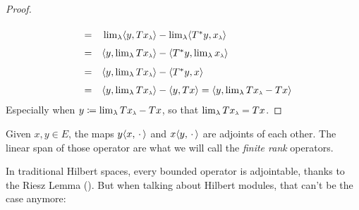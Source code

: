 \begin{proposicao}
\begin{proof}
\begin{equation*}{}
\begin{array}{rcl}
        &=& \vphantom{\int\limits_a^b}\lim_\lambda \inner{y}{T\sub x\lambda} - \lim_\lambda\inner{T^*y}{\sub x\lambda} \\
        &=& \inner{y}{\textstyle{\lim_\lambda T\sub x\lambda}} - \inner{T^*y}{{\textstyle\lim_\lambda \sub x\lambda}} \\
        &=& \vphantom{\int\limits_a^b}\inner{y}{{\textstyle\lim_\lambda T\sub x\lambda}} - \inner{T^*y}x\\
        &=& \inner{y}{{\textstyle\lim_\lambda T\sub x\lambda}} - \inner{y}{Tx} = \inner{y}{\lim_\lambda T\sub x\lambda - Tx}
        \end{array}
        \end{equation*}
        Especially when $y \coloneqq \lim_\lambda T\sub x\lambda  - Tx$, so that $\lim_\lambda T\sub x\lambda = Tx$.
    \end{proof}
\end{proposicao}
    
\begin{exemplo}
    \label{exemplo:finite rank}
    Given $x,y \in E$, the maps $y\langle {x},{\operatorname{\,\cdot\,}}\rangle$ and $x\langle {y},{\operatorname{\,\cdot\,}}\rangle$ are adjoints of each other. The linear span of those operator are what we will call the \textit{finite rank} operators.
\end{exemplo}
    
In traditional Hilbert spaces, every bounded operator is adjointable, thanks to the Riesz Lemma (\cite{reed2012methods}). But when talking about Hilbert modules, that can't be the case anymore:
    
